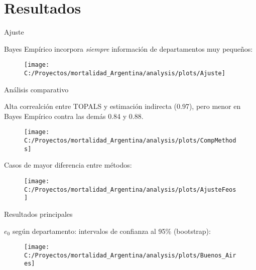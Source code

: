 \documentclass[10pt,ignorenonframetext,]{beamer}
\begin{document}
\section{Resultados}\label{resultados}

\begin{frame}{Ajuste}

Bayes Empírico incorpora \emph{siempre} información de departamentos muy
pequeños:

\begin{figure}

{\centering \texttt{[image: C:/Proyectos/mortalidad\_Argentina/analysis/plots/Ajuste]} 

}

\end{figure}

\end{frame}

\begin{frame}{Análisis comparativo}

Alta correalción entre TOPALS y estimación indirecta (0.97), pero menor
en Bayes Empírico contra las demás 0.84 y 0.88.

\begin{figure}

{\centering \texttt{[image: C:/Proyectos/mortalidad\_Argentina/analysis/plots/CompMethods]} 

}

\end{figure}

\end{frame}

\begin{frame}

Casos de mayor diferencia entre métodos:

\begin{figure}

{\centering \texttt{[image: C:/Proyectos/mortalidad\_Argentina/analysis/plots/AjusteFeos]} 

}

\end{figure}

\end{frame}

\begin{frame}{Resultados principales}

\(e_0\) según departamento: intervalos de confianza al 95\% (bootstrap):

\pause

\begin{figure}

{\centering \texttt{[image: C:/Proyectos/mortalidad\_Argentina/analysis/plots/Buenos\_Aires]} 

}

\end{figure}

\end{frame}
\end{document}
